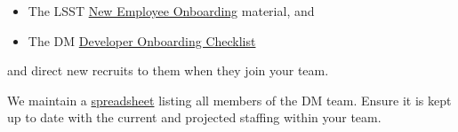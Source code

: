 \begin{itemize}
\item
  The LSST \href{https://project.lsst.org/onboarding}{New Employee
  Onboarding} material, and
\item
  The DM
  \href{https://developer.lsst.io/getting-started/onboarding.html}{Developer
  Onboarding Checklist}
\end{itemize}

and direct new recruits to them when they join your team.

We maintain a
\href{https://docs.google.com/spreadsheets/d/1G9KXBJJHfWkVDQeApfXaN_nZjD_YUJlHiEDOzhTy-0c/edit?usp=drive_web}{spreadsheet}
listing all members of the DM team. Ensure it is kept up to date with
the current and projected staffing within your team.
